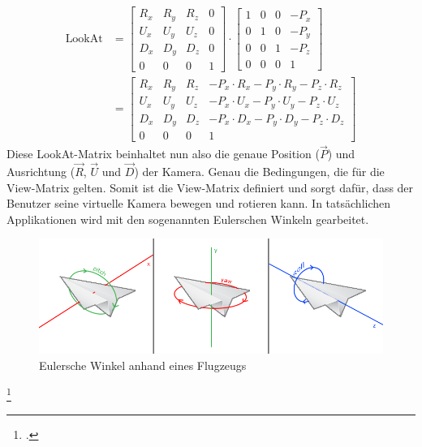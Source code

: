 \documentclass[titlepage, 11pt, a4paper, ngerman]{article}
\begin{document}
\begin{align*}
    \text{LookAt} &= 
    \begin{bmatrix}
    R_{x} & R_{y} & R_{z} & 0 \\
    U_{x} & U_{y} & U_{z} & 0 \\
    D_{x} & D_{y} & D_{z} & 0 \\
    0 & 0 & 0 & 1
    \end{bmatrix} \cdot 
    \begin{bmatrix}
    1 & 0 & 0 & -P_{x} \\
    0 & 1 & 0 & -P_{y} \\
    0 & 0 & 1 & -P_{z} \\
    0 & 0 & 0 & 1
    \end{bmatrix} \\ &=
    \begin{bmatrix}
    R_{x} & R_{y} & R_{z} & -P_{x} \cdot R_{x} - P_{y} \cdot R_{y} - P_{z} \cdot R_{z} \\
    U_{x} & U_{y} & U_{z} & -P_{x} \cdot U_{x} - P_{y} \cdot U_{y} - P_{z} \cdot U_{z} \\
    D_{x} & D_{y} & D_{z} & -P_{x} \cdot D_{x} - P_{y} \cdot D_{y} - P_{z} \cdot D_{z} \\
    0 & 0 & 0 & 1
    \end{bmatrix}
\end{align*}
\bigbreak
Diese LookAt-Matrix beinhaltet nun also die genaue Position ($\vec{P}$) und Ausrichtung ($\vec{R}$, $\vec{U}$ und $\vec{D}$) der Kamera. Genau die Bedingungen, die für die View-Matrix gelten. Somit ist die View-Matrix definiert und sorgt dafür, dass der Benutzer seine virtuelle Kamera bewegen und rotieren kann. In tatsächlichen Applikationen wird mit den sogenannten Eulerschen Winkeln gearbeitet. 
\begin{figure}[ht]
    \centering
    \includegraphics[scale=0.4]{res/euler-angles2.png}
    \caption[Eulersche Winkel anhand eines Flugzeugs]{Eulersche Winkel anhand eines Flugzeugs\footnotemark}
    \label{fig:euler-angles}
\end{figure}
\footcitetext{logl-camera}
\end{document}
